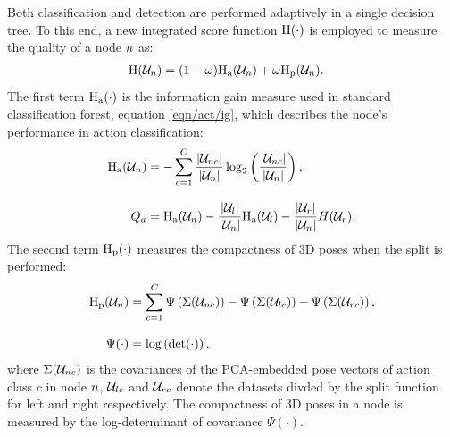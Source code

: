 Both classification and detection are performed adaptively in a single decision tree. To this end, a new integrated score function $\mathrm{H}(\cdot)$ is employed to measure the quality of a node $n$ as:
\begin{align}
	\label{eqn/body/newquality}
	\mathrm{H}(\mathcal{U}_{n}) & = (1 - \omega)\mathrm{H_{a}}(\mathcal{U}_{n}) + \omega\mathrm{H_{p}}(\mathcal{U}_{n}).
\end{align}
The first term $\mathrm{H_{a}}(\cdot)$ is the information gain measure used in standard classification forest, \cf equation \ref{eqn/act/ig}, which describes the node's performance in action classification: 
\begin{equation}
	\label{eqn/body/infogain}
	\begin{aligned}
		\mathrm{H_{a}}(\mathcal{U}_{n}) & = 
		- \displaystyle\sum_{c = 1}^{C} \frac{|\mathcal{U}_{n c}|}{|\mathcal{U}_{n}|}\log_{2}\left(\frac{|\mathcal{U}_{n c}|}{|\mathcal{U}_{n}|}\right), \\[3mm]
		Q_{a} & = 
		\mathrm{H_{a}}(\mathcal{U}_{n}) - 
		\frac{|\mathcal{U}_{l}|}{|\mathcal{U}_{n}|} \mathrm{H_{a}}(\mathcal{U}_{l}) -  
		\frac{|\mathcal{U}_{r}|}{|\mathcal{U}_{n}|} H(\mathcal{U}_{r}). 
	\end{aligned}
\end{equation}
The second term $\mathrm{H_{p}}(\cdot)$ measures the compactness of 3D poses when the split is performed:
\begin{align}
	\mathrm{H_{p}}(\mathcal{U}_{n}) & = \displaystyle\sum_{c = 1}^{C} \Psi\left(\Sigma(\mathcal{U}_{n c})\right) - \Psi\left(\Sigma(\mathcal{U}_{lc})\right) 
	- \Psi\left(\Sigma(\mathcal{U}_{rc})\right), \\[3mm]
	\Psi(\cdot) & = \log\left(\det(\cdot)\right),
\end{align} 
where $\Sigma(\mathcal{U}_{n c})$ is the covariances of the PCA-embedded pose vectors of action class $c$ in node $n$, $\mathcal{U}_{lc}$ and $\mathcal{U}_{rc}$ denote the datasets divded by the split function for left and right respectively. The compactness of 3D poses in a node is measured by the log-determinant of covariance $\Psi(\cdot)$. 

